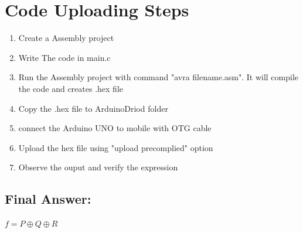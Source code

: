 \documentclass[a4paper,12pt]{article}
\begin{document}
\section*{Code Uploading Steps}
\begin{enumerate}
	\item Create a Assembly  project
	\item Write The code in main.c
	\item Run the Assembly project with command "avra filename.asm". It will compile the code and creates .hex file
	\item Copy the .hex file to ArduinoDriod folder
	\item connect the Arduino UNO to mobile with OTG cable
	\item Upload the hex file using "upload precomplied" option
	\item Observe the ouput and verify the expression
\end{enumerate}
\subsection*{Final Answer:}

$
\boxed{f = P \oplus Q \oplus R}
$
\end{document}
